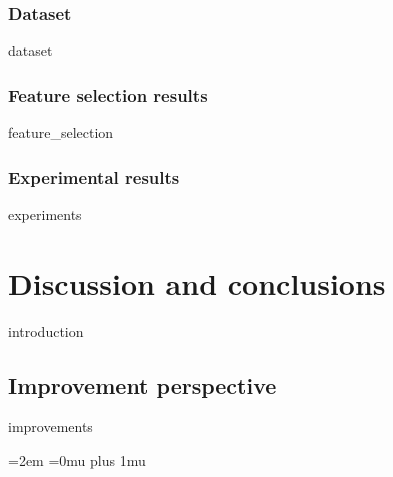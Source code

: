 \documentclass[12pt]{report}
\begin{document}
         \subsection{Dataset}
        {dataset}
     
        \subsection{Feature selection results}
        \label{sec:feature_selection_noise}
        {feature_selection}
        
        \subsection{Experimental results}	
        {experiments}

\chapter{Discussion and conclusions}        
    \label{chapter:conclusions}
    {introduction}
    
    \section{Improvement perspective}
    {improvements}
   



\newpage
\emergencystretch=2em
\Urlmuskip=0mu plus 1mu\relax

\printbibliography[heading=bibintoc]
\listoffigures
\listoftables
\end{document}
